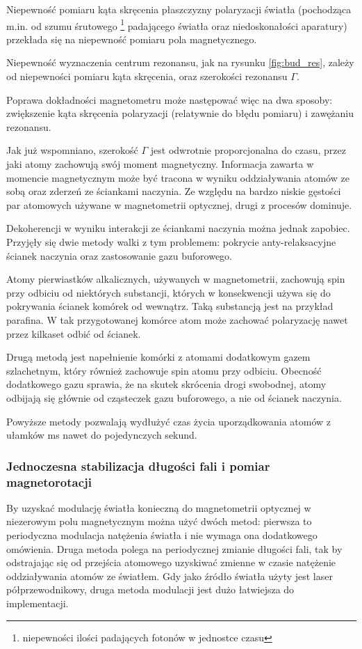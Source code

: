 \documentclass[a4paper,10pt,twoside]{report}
\begin{document}
Niepewność pomiaru kąta skręcenia płaszczyzny polaryzacji światła (pochodząca m.in. od szumu śrutowego \footnote{niepewności ilości padających fotonów w jednostce czasu} padającego światła oraz niedoskonałości aparatury) przekłada się na niepewność pomiaru pola magnetycznego.

Niepewność wyznaczenia centrum rezonansu, jak na rysunku \ref{fig:bud_res}, zależy od niepewności pomiaru kąta skręcenia, oraz szerokości rezonansu $\Gamma$.

Poprawa dokładności magnetometru może następować więc na dwa sposoby: zwiększenie kąta skręcenia polaryzacji (relatywnie do błędu pomiaru) i zawężaniu rezonansu.

 Jak już wspomniano, szerokość $\Gamma$ jest odwrotnie proporcjonalna do czasu, przez jaki atomy zachowują swój moment magnetyczny. Informacja zawarta w momencie magnetycznym może być tracona w wyniku oddziaływania atomów ze sobą oraz zderzeń ze ściankami naczynia. Ze względu na bardzo niskie gęstości par atomowych używane w magnetometrii optycznej, drugi z procesów dominuje.
 
Dekoherencji w wyniku interakcji ze ściankami naczynia można jednak zapobiec. Przyjęły się dwie metody walki z tym problemem: pokrycie anty-relaksacyjne ścianek naczynia oraz zastosowanie gazu buforowego.

Atomy pierwiastków alkalicznych, używanych w magnetometrii, zachowują spin przy odbiciu od niektórych substancji, których w konsekwencji używa się do pokrywania ścianek komórek od wewnątrz. Taką substancją jest na przykład parafina. W tak przygotowanej komórce atom może zachować polaryzację nawet przez kilkaset odbić od ścianek.

Drugą metodą jest napełnienie komórki z atomami dodatkowym gazem szlachetnym, który również zachowuje spin atomu przy odbiciu. Obecność dodatkowego gazu sprawia, że na skutek skrócenia drogi swobodnej, atomy odbijają się głównie od cząsteczek gazu buforowego, a nie od ścianek naczynia.

Powyższe metody pozwalają wydłużyć czas życia uporządkowania atomów z ułamków ms nawet do pojedynczych sekund.

\subsubsection{Jednoczesna stabilizacja długości fali i pomiar magnetorotacji}
\label{pl:stab1h}

By uzyskać modulację światła konieczną do magnetometrii optycznej w niezerowym polu magnetycznym można użyć dwóch metod: pierwsza to periodyczna modulacja natężenia światła i nie wymaga ona dodatkowego omówienia. Druga metoda polega na periodycznej zmianie długości fali, tak by odstrajając się od przejścia atomowego uzyskiwać zmienne w czasie natężenie oddziaływania atomów ze światłem. Gdy jako źródło światła użyty jest laser półprzewodnikowy, druga metoda modulacji jest dużo łatwiejsza do implementacji.
\end{document}

